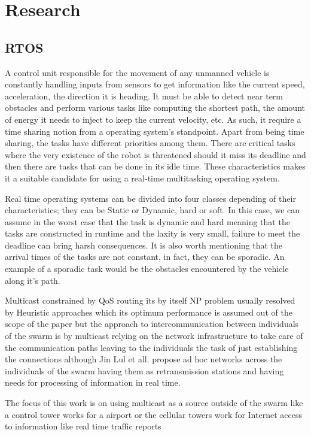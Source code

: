 \documentclass[journal]{IEEEtran}
\begin{document}
\section{Research}
\subsection{RTOS}
A control unit responsible for the movement of any unmanned vehicle is constantly handling inputs from sensors to get information like the current speed, acceleration, the direction it is heading. It must be able to detect near term obstacles and perform various tasks like computing the shortest path, the amount of energy it needs to inject to keep the current velocity, etc. As such, it require a time sharing notion from a operating system's standpoint. Apart from being time sharing, the tasks have different priorities among them. There are critical tasks where the very existence of the robot is threatened should it miss its deadline and then there are tasks that can be done in its idle time. These characteristics makes it a suitable candidate for using a real-time multitasking operating system.

Real time operating systems can be divided into four classes depending of their characteristics; they can be Static or Dynamic, hard or soft. In this case, we can assume in the worst case that the task is dynamic and hard meaning that the tasks are constructed in runtime and the laxity is very small, failure to meet the deadline can bring harsh consequences. It is also worth mentioning that the arrival times of the tasks are not constant, in fact, they can be sporadic. An example of a sporadic task would be the obstacles encountered by the vehicle along it's path.

Multicast constrained by QoS routing its by itself NP problem usually resolved by Heuristic approaches \cite{HH1} which its optimum performance is assumed out of the scope of the paper but the approach to  intercommunication between individuals of the swarm is by multicast relying on the network infrastructure to take care of the communication paths leaving to the individuals the task of just establishing the connections although Jin Lul et all. \cite{HH2} propose ad hoc networks across the individuals of the swarm having them as retransmission stations and having needs for processing of information in real time.

The focus of this work is on using multicast as a source outside of the swarm like a control tower works for a airport or the cellular towers work for Internet access to information like real time traffic reports\cite{YS1}
\end{document}
